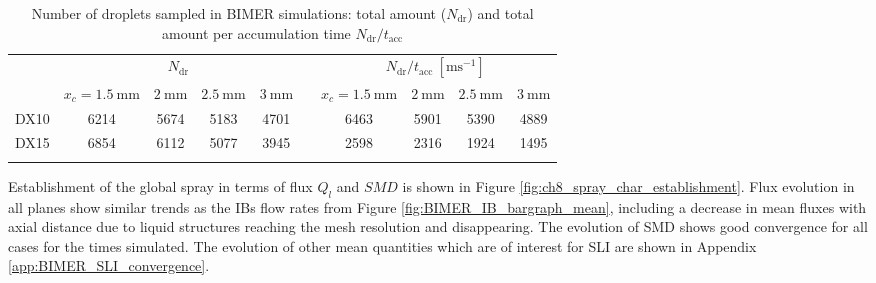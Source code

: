 \begin{table}[!h]
\centering
\caption{Number of droplets sampled in BIMER simulations: total amount ($N_\mathrm{dr}$) and total amount per accumulation time $N_\mathrm{dr}/t_\mathrm{acc}$}
\begin{tabular}{cccccccccc}
\thickhline
\multirow{2}{*}{ \textbf{Case}}  & \multicolumn{4}{c}{$N_\mathrm{dr}$} & & \multicolumn{4}{c}{$N_\mathrm{dr}/t_\mathrm{acc}~[\mathrm{ms}^{-1}]$} \\
\cline{2-5} \cline{7-10}
& $x_c = 1.5~\mathrm{mm}$ & $2~\mathrm{mm}$ & $2.5~\mathrm{mm}$ & $3~\mathrm{mm}$ &  & $x_c = 1.5~\mathrm{mm}$ & $2~\mathrm{mm}$ & $2.5~\mathrm{mm}$ & $3~\mathrm{mm}$   \\
\thickhline 
DX10  & 6214 & 5674 & 5183 & 4701 & & 6463 & 5901 & 5390 & 4889  \\
DX15  & 6854 & 6112 & 5077 & 3945 &  & 2598 & 2316 & 1924 & 1495  \\
\thickhline
\end{tabular}
\label{tab:BIMER_SLI_Ndr_accumulated}
\end{table}



Establishment of the global spray in terms of flux $Q_l$ and $SMD$ is shown in Figure \ref{fig:ch8_spray_char_establishment}.  Flux evolution in all planes show similar trends as the IBs flow rates from Figure \ref{fig:BIMER_IB_bargraph_mean}, including a decrease in mean fluxes with axial distance due to liquid structures reaching the mesh resolution and disappearing. The evolution of SMD shows good convergence for all cases for the times simulated. The evolution of other mean quantities which are of interest for SLI are shown in Appendix \ref{app:BIMER_SLI_convergence}.


